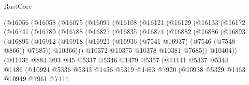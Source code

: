 \begin{lexlean}{RustCore}
\begin{coremodule}
        (@16056
          (@16058
            (@16075
              (@16091
                (@16108
                  (@16121
                    (@16129
                      (@16133
                        (@16172
                          (@16741
                            (@16780
                              (@16788
                                (@16827
                                  (@16835
                                    (@16874
                                      (@16882
                                        (@16886
                                          (@16893
                                            (@16896
                                              (@16912
                                                (@16918
                                                  (@16921
                                                    (@16936
                                                      (@7541 @16937)
                                                      (@7546 (@7548 @866))
                                                      @7685))
                                                  @10366)))
                                            @10372
                                            @10375
                                            @10378
                                            @10381
                                            @7685))
                                        @10404))
                                    (@11131
                                      @884
                                      @93
                                      @45
                                      @5337
                                      @5346
                                      @1479
                                      @5357
                                      (@11141
                                        @5337
                                        @5344
                                        @1486
                                        (@10924
                                          @5336
                                          @5343
                                          @1456
                                          @5319
                                          @1463
                                          @7920
                                          (@10938
                                            @5329
                                            @1463
                                            @10949
                                            @7961
                                            @7414

\end{coremodule}
\end{lexlean}
